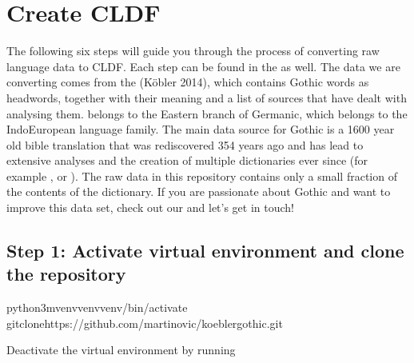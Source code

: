 \documentclass[letterpaper,10pt,english]{sphinxmanual}
\begin{document}
\chapter{Create CLDF}
\label{\detokenize{mkcldf:create-cldf}}\label{\detokenize{mkcldf::doc}}
\sphinxAtStartPar
The following six steps will guide you through the process of
converting raw language data to CLDF. Each step can be found in the
as well. The data we are converting comes from
the  (Köbler 2014),
which contains Gothic words as headwords, together with their
meaning and a list of sources that have dealt with analysing them.
 belongs to the
Eastern branch of Germanic, which belongs to the
Indo\sphinxhyphen{}European language family. The main data source for Gothic is a
1600 year old bible translation that was rediscovered 354 years ago and has
lead to extensive analyses and the creation of multiple dictionaries ever
since (for example , or ).
The raw data in this repository contains
only a small fraction of the contents of the dictionary.
If you are passionate about Gothic and want to improve this data
set, check out our 
and let’s get in touch!


\section{Step 1: Activate virtual environment and clone the repository}
\label{\detokenize{mkcldf:step-1-activate-virtual-environment-and-clone-the-repository}}
\begin{sphinxVerbatim}[commandchars=\\\{\}]
python3\PYGZhy{}mvenvvenvvenv/bin/activate
gitclonehttps://github.com/martino\PYGZhy{}vic/koeblergothic.git
\end{sphinxVerbatim}

\sphinxAtStartPar
Deactivate the virtual environment by running
\end{document}
